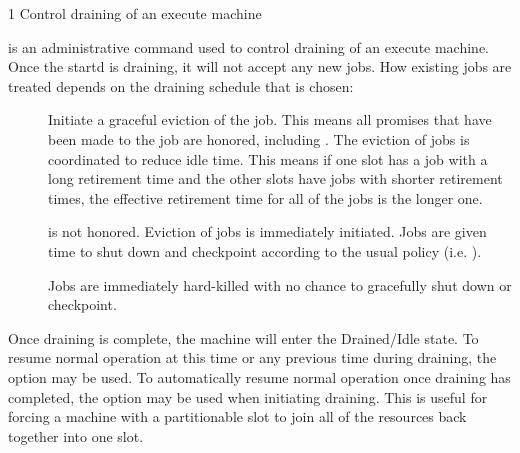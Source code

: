 \begin{ManPage}
{\label{man-condor-drain}}{1}
{Control draining of an execute machine}
\Synopsis {}

\ToolDebugOption
{}


\Description

 is an administrative command used to control draining
of an execute machine.  Once the startd is draining, it will not
accept any new jobs.  How existing jobs are treated depends on the
draining schedule that is chosen:

\begin{description}

\item[] Initiate a graceful eviction of the job.  This means
all promises that have been made to the job are honored, including
.  The eviction of jobs is coordinated
to reduce idle time.  This means if one slot has a job with a long
retirement time and the other slots have jobs with shorter retirement
times, the effective retirement time for all of the jobs is the longer
one.

\item[]  is not honored.  Eviction
of jobs is immediately initiated.  Jobs are given time to shut down
and checkpoint according to the usual policy
(i.e. ).

\item[] Jobs are immediately hard-killed with no chance to
gracefully shut down or checkpoint.

\end{description}

Once draining is complete, the machine will enter the Drained/Idle
state.  To resume normal operation at this time or any previous time
during draining, the  option may be used.  To
automatically resume normal operation once draining has completed, the
 option may be used when initiating
draining.  This is useful for forcing a machine with a partitionable
slot to join all of the resources back together into one slot.


\end{ManPage}
